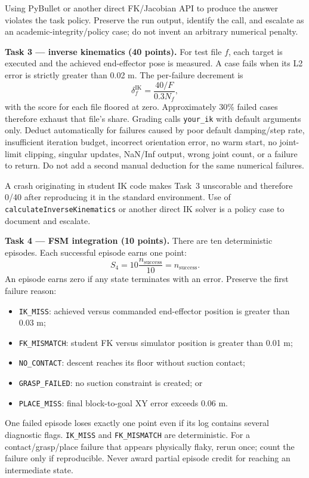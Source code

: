 \documentclass[11pt]{article}
\newcommand{\code}[1]{\nolinkurl{#1}}
\begin{document}
\begin{tutornote}
Using PyBullet or another direct FK/Jacobian API to produce the answer violates
the task policy. Preserve the run output, identify the call, and escalate as an
academic-integrity/policy case; do not invent an arbitrary numerical penalty.

\medskip
\textbf{Task 3 --- inverse kinematics (40 points).}
For test file \(f\), each target is executed and the achieved end-effector pose
is measured. A case fails when its L2 error is strictly greater than 0.02 m.
The per-failure decrement is
\[
\delta^{\mathrm{IK}}_f=\frac{40/F}{0.3N_f},
\]
with the score for each file floored at zero. Approximately 30\% failed cases
therefore exhaust that file's share. Grading calls \code{your_ik} with default
arguments only. Deduct automatically for failures caused by poor default
damping/step rate, insufficient iteration budget, incorrect orientation error,
no warm start, no joint-limit clipping, singular updates, NaN/Inf output, wrong
joint count, or a failure to return. Do not add a second manual deduction for
the same numerical failures.

A crash originating in student IK code makes Task~3 unscorable and therefore
0/40 after reproducing it in the standard environment. Use of
\code{calculateInverseKinematics} or another direct IK solver is a policy case
to document and escalate.

\medskip
\textbf{Task 4 --- FSM integration (10 points).}
There are ten deterministic episodes. Each successful episode earns one point:
\[
S_4=10\frac{n_{\mathrm{success}}}{10}=n_{\mathrm{success}}.
\]
An episode earns zero if any state terminates with an error. Preserve the first
failure reason:
\begin{itemize}
  \item \code{IK_MISS}: achieved versus commanded end-effector position is
    greater than 0.03 m;
  \item \code{FK_MISMATCH}: student FK versus simulator position is greater
    than 0.01 m;
  \item \code{NO_CONTACT}: descent reaches its floor without suction contact;
  \item \code{GRASP_FAILED}: no suction constraint is created; or
  \item \code{PLACE_MISS}: final block-to-goal XY error exceeds 0.06 m.
\end{itemize}
One failed episode loses exactly one point even if its log contains several
diagnostic flags. \code{IK_MISS} and \code{FK_MISMATCH} are deterministic.
For a contact/grasp/place failure that appears physically flaky, rerun once;
count the failure only if reproducible. Never award partial episode credit for
reaching an intermediate state.


\end{tutornote}
\end{document}
